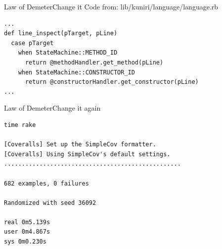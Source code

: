 \documentclass[10pt]{beamer}
\begin{document}
\begin{frame}[fragile]{Law of Demeter}{Change it}
\small
Code from: lib/kuniri/language/language.rb
\begin{lstlisting}
...
def line_inspect(pTarget, pLine)
  case pTarget
    when StateMachine::METHOD_ID
      return @methodHandler.get_method(pLine)
    when StateMachine::CONSTRUCTOR_ID
      return @constructorHandler.get_constructor(pLine)
...
\end{lstlisting}
\end{frame}

\begin{frame}[fragile]{Law of Demeter}{Change it again}
\small
\begin{lstlisting}
time rake

[Coveralls] Set up the SimpleCov formatter.
[Coveralls] Using SimpleCov's default settings.
..................................................

682 examples, 0 failures

Randomized with seed 36092

real 0m5.139s
user 0m4.867s
sys 0m0.230s
\end{lstlisting}
\end{frame}
\end{document}
